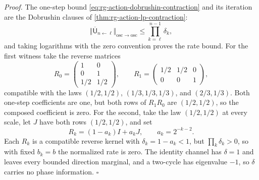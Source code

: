 \noindent\emph{Proof.}
The one-step bound \eqref{eq:rg-action-dobrushin-contraction} and its
iteration are the Dobrushin clauses of \cref{thm:rg-action-lp-contraction}:
\begin{equation}
\Vert\overline{\mathsf U}_{n\leftarrow\ell}\Vert_{\mathrm{osc}\to\mathrm{osc}}
\leq\prod_{k=\ell}^{n-1}\delta_k,
\label{eq:rg-action-dobrushin-product-bound}
\end{equation}
and taking logarithms with the zero convention proves the rate bound. For the
first witness take the reverse matrices
\begin{equation}
R_0=
\begin{pmatrix}
1&0\\0&1\\1/2&1/2
\end{pmatrix},
\qquad
R_1=
\begin{pmatrix}
1/2&1/2&0\\0&0&1
\end{pmatrix},
\label{eq:rg-dobrushin-nonnecessity-witness}
\end{equation}
compatible with the laws \((1/2,1/2)\), \((1/3,1/3,1/3)\), and \((2/3,1/3)\).
Both one-step coefficients are one, but both rows of \(R_1R_0\) are
\((1/2,1/2)\), so the composed coefficient is zero. For the second, take the
law \((1/2,1/2)\) at every scale, let \(J\) have both rows \((1/2,1/2)\), and
set
\begin{equation}
R_k=(1-a_k)I+a_kJ,
\qquad a_k=2^{-k-2}.
\label{eq:rg-dobrushin-one-step-insufficient-witness}
\end{equation}
Each \(R_k\) is a compatible reverse kernel with \(\delta_k=1-a_k<1\), but
\(\prod_k\delta_k>0\), so with fixed \(b_k=b\) the normalized rate is zero.
The identity channel has \(\delta=1\) and leaves every bounded direction
marginal, and a two-cycle has eigenvalue \(-1\), so \(\delta\) carries no
phase information. \(\square\)

